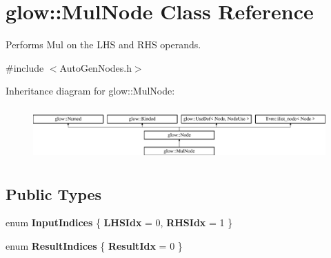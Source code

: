 \hypertarget{classglow_1_1_mul_node}{}\section{glow\+:\+:Mul\+Node Class Reference}
\label{classglow_1_1_mul_node}


Performs Mul on the L\+HS and R\+HS operands.  




{\ttfamily \#include $<$Auto\+Gen\+Nodes.\+h$>$}

Inheritance diagram for glow\+:\+:Mul\+Node\+:\begin{figure}[H]
\begin{center}
\leavevmode
\includegraphics[height=2.028986cm]{classglow_1_1_mul_node}
\end{center}
\end{figure}
\subsection*{Public Types}
\begin{DoxyCompactItemize}
\item 
\mbox{\label{classglow_1_1_mul_node_a2b5acde17e02d4683ce4ca6304c1aa23}} 
enum {\bfseries Input\+Indices} \{ {\bfseries L\+H\+S\+Idx} = 0, 
{\bfseries R\+H\+S\+Idx} = 1
 \}
\item 
\mbox{\label{classglow_1_1_mul_node_afc824d97a01874f8b15c271dbe89d799}} 
enum {\bfseries Result\+Indices} \{ {\bfseries Result\+Idx} = 0
 \}
\end{DoxyCompactItemize}
